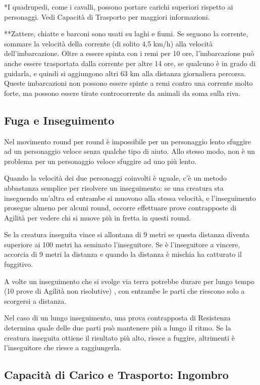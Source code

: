 \documentclass[a4paper,11pt,twoside,openany]{book}
\begin{document}
*I quadrupedi, come i cavalli, possono portare carichi superiori rispetto ai personaggi. Vedi Capacità di Trasporto per maggiori informazioni.

**Zattere, chiatte e barconi sono usati su laghi e fiumi. Se seguono la corrente, sommare la velocità della corrente (di solito 4,5 km/h) alla velocità dell'imbarcazione. Oltre a essere spinta con i remi per 10 ore, l'imbarcazione può anche essere trasportata dalla corrente per altre 14 ore, se qualcuno è in grado di guidarla, e quindi si aggiungono altri 63 km alla distanza giornaliera percorsa. Queste imbarcazioni non possono essere spinte a remi contro una corrente molto forte, ma possono essere tirate controcorrente da animali da soma sulla riva.

\subsection{Fuga e Inseguimento}

Nel movimento round per round è impossibile per un personaggio lento sfuggire ad un personaggio veloce senza qualche tipo di aiuto. Allo stesso modo, non è un problema per un personaggio veloce sfuggire ad uno più lento.

Quando la velocità dei due personaggi coinvolti è uguale, c'è un metodo abbastanza semplice per risolvere un inseguimento: se una creatura sta inseguendo un'altra ed entrambe si muovono alla stessa velocità, e l'inseguimento prosegue almeno per alcuni round, occorre effettuare prove contrapposte di Agilità per vedere chi si muove più in fretta in questi round.

Se la creatura inseguita vince si allontana di 9 metri se questa distanza diventa superiore ai 100 metri ha seminato l'inseguitore. Se è l'inseguitore a vincere, accorcia di 9 metri la distanza e quando la distanza è mischia ha catturato il fuggitivo.

A volte un inseguimento che si svolge via terra potrebbe durare per lungo tempo (10 prove di Agilità non risolutive) , con entrambe le parti che riescono solo a scorgersi a distanza.

Nel caso di un lungo inseguimento, una prova contrapposta di Resistenza determina quale delle due parti può mantenere più a lungo il ritmo. Se la creatura inseguita ottiene il risultato più alto, riesce a fuggire, altrimenti è l'inseguitore che riesce a raggiungerla.

\subsection{Capacità di Carico e Trasporto: Ingombro}
\end{document}
